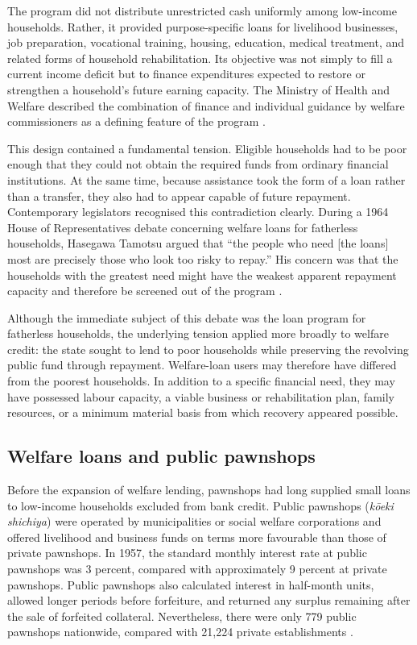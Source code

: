 \documentclass[12pt]{article}
\begin{document}
The program did not distribute unrestricted cash uniformly among low-income households. Rather, it provided purpose-specific loans for livelihood businesses, job preparation, vocational training, housing, education, medical treatment, and related forms of household rehabilitation. Its objective was not simply to fill a current income deficit but to finance expenditures expected to restore or strengthen a household's future earning capacity. The Ministry of Health and Welfare described the combination of finance and individual guidance by welfare commissioners as a defining feature of the program \citep{MinistryOfHealth1964}.

This design contained a fundamental tension. Eligible households had to be poor enough that they could not obtain the required funds from ordinary financial institutions. At the same time, because assistance took the form of a loan rather than a transfer, they also had to appear capable of future repayment. Contemporary legislators recognised this contradiction clearly. During a 1964 House of Representatives debate concerning welfare loans for fatherless households, Hasegawa Tamotsu argued that ``the people who need [the loans] most are precisely those who look too risky to repay.'' His concern was that the households with the greatest need might have the weakest apparent repayment capacity and therefore be screened out of the program \citep{NationalDietLibrary1964}.

Although the immediate subject of this debate was the loan program for fatherless households, the underlying tension applied more broadly to welfare credit: the state sought to lend to poor households while preserving the revolving public fund through repayment. Welfare-loan users may therefore have differed from the poorest households. In addition to a specific financial need, they may have possessed labour capacity, a viable business or rehabilitation plan, family resources, or a minimum material basis from which recovery appeared possible.

\subsection{Welfare loans and public pawnshops}

Before the expansion of welfare lending, pawnshops had long supplied small loans to low-income households excluded from bank credit. Public pawnshops (\textit{k\={o}eki shichiya}) were operated by municipalities or social welfare corporations and offered livelihood and business funds on terms more favourable than those of private pawnshops. In 1957, the standard monthly interest rate at public pawnshops was 3 percent, compared with approximately 9 percent at private pawnshops. Public pawnshops also calculated interest in half-month units, allowed longer periods before forfeiture, and returned any surplus remaining after the sale of forfeited collateral. Nevertheless, there were only 779 public pawnshops nationwide, compared with 21,224 private establishments \citep{MinistryOfHealth1958}.
\end{document}
